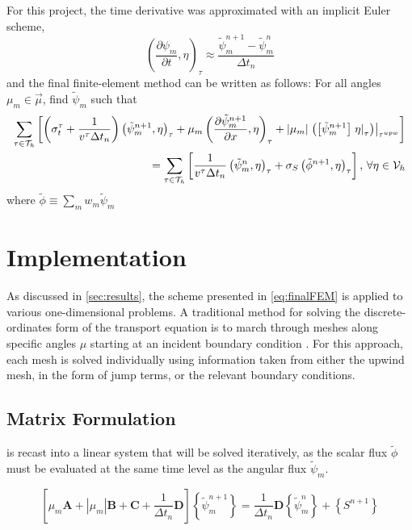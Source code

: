 \documentclass{article}
\newcommand{\tauh}{\mathcal{T}_h}
\newcommand{\pdiff}[2]{\frac{\partial#1}{\partial#2}}
\newcommand{\ddx}[1]{\pdiff{#1}{x}}
\newcommand{\ddt}[1]{\pdiff{#1}{t}}
\newcommand{\dpmdt}{\ddt{\psi_m}}
\newcommand{\sumTaus}{\sum_{\tauinT}}
\newcommand{\tfem}{finite-element method }
\newcommand{\tauinT}{\tau\in\tauh}
\newcommand{\fepsi}{\tilde{\psi}}
\newcommand{\fepsim}{\fepsi_m}
\newcommand{\innerProd}[2]{\left(#1,#2\right)}
\newcommand{\tauInt}[2]{\innerProd{#1}{#2}_\tau}
\newcommand{\inTau}[1]{\left.#1\right\vert_{\tau}}
\newcommand{\fephi}{\tilde{\phi}}
\newcommand{\mabs}[1]{\left|#1\right|}
\newcommand{\jump}[1]{\left[#1\right]}
\newcommand{\asMatrix}[1]{\mathbf{#1}}
\newcommand{\asVector}[1]{\left\lbrace#1\right\rbrace}
\begin{document}
For this project, the time derivative was approximated with an implicit Euler scheme, 
\begin{equation}
    \label{eq:timeDeriv}
    \tauInt{\dpmdt}{\eta}\approx\frac{\fepsim^{n+1}-\fepsim^n}{\Delta t_n}
\end{equation}
and the final \tfem can be written as follows: For all angles $\mu_m\in\vec{\mu}$, find $\fepsim$ such that
\begin{equation}
    \label{eq:finalFEM}
    \begin{split}
        \sumTaus\left[
            \left(\sigma_t^\tau+\frac{1}{v^\tau\Delta t_n}\right)\tauInt{\fepsim^{n+1}}{\eta}
            +\mu_m\tauInt{\ddx{\fepsim^{n+1}}}{\eta}
            +\mabs{\mu_m}\left.\left(\jump{\fepsim^{n+1}}\inTau{\eta}\right)\right|_{\tau^{upw}}
            \right] \\
        = \sumTaus\left[
            \frac{1}{v^\tau\Delta t_n}\tauInt{\fepsim^n}{\eta}
            +\sigma_S\tauInt{\fephi^{n+1}}{\eta}
            \right]
        \forEtaInV
    \end{split}
\end{equation}
where $\fephi\equiv\sum_mw_m\fepsim$

\section{Implementation} \label{sec:implement}
As discussed in \cref{sec:results}, the scheme presented in \cref{eq:finalFEM} is applied to
various one-dimensional problems. 
A traditional method for solving the discrete-ordinates form of the transport equation 
is to march through meshes along specific angles $\mu$ starting at an incident 
boundary condition \cite{lewis1984computational}.
For this approach, each mesh is solved individually using information taken from
either the upwind mesh, in the form of jump terms, or the relevant boundary conditions.

\subsection{Matrix Formulation}

 is recast into a linear system that will be solved iteratively, as the
scalar flux $\fephi$ must be evaluated at the same time level as the angular flux $\fepsim$.

\begin{equation}
    \label{eq:matrixFEM}
    \left[
        \mu_m\asMatrix{A}+\mabs{\mu_m}\asMatrix{B} + \asMatrix{C}
        +\frac{1}{\Delta t_n}\asMatrix{D}
    \right]
    \asVector{\fepsim^{n+1}}
    =\frac{1}{\Delta t_n}\asMatrix{D}\asVector{\fepsim^n}+\asVector{S^{n+1}}
\end{equation}
\end{document}
